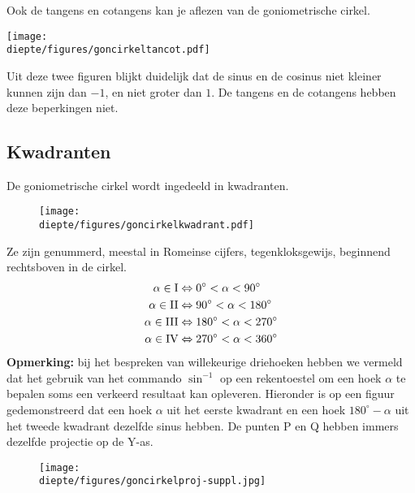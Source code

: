 \documentclass[a4paper,12pt]{article}
\newcommand{\diepte}{./}
\begin{document}
Ook de tangens en cotangens kan je aflezen van de goniometrische cirkel.

\begin{center}
\texttt{[image: \\diepte/figures/goncirkeltancot.pdf]}
\end{center}

Uit deze twee figuren blijkt duidelijk dat de sinus en de cosinus niet kleiner kunnen zijn dan $-1$, en niet groter dan $1$. De tangens en de cotangens hebben deze beperkingen niet.

\subsection{Kwadranten}

De goniometrische cirkel wordt ingedeeld in kwadranten.

\begin{figure}[h]
\begin{center}
\texttt{[image: \\diepte/figures/goncirkelkwadrant.pdf]}
\end{center}
\end{figure}

Ze zijn genummerd, meestal in Romeinse cijfers, tegenkloksgewijs, beginnend rechtsboven in de cirkel.
\begin{align*}
\alpha \in \textup{I} &\Leftrightarrow 0^\circ < \alpha < 90^\circ\\
\alpha \in \textup{II} &\Leftrightarrow 90^\circ < \alpha < 180^\circ\\
\alpha \in \textup{III} &\Leftrightarrow 180^\circ < \alpha < 270^\circ\\
\alpha \in \textup{IV} &\Leftrightarrow 270^\circ < \alpha < 360^\circ
\end{align*}
{\bf Opmerking:} bij het bespreken van willekeurige driehoeken hebben we vermeld dat het gebruik van het commando $\sin^{-1}$ op een rekentoestel om een hoek $\alpha$ te bepalen soms een verkeerd resultaat kan opleveren. Hieronder is op een figuur gedemonstreerd dat een hoek $\alpha$ uit het eerste kwadrant en een hoek $180^\circ -\alpha$ uit het tweede kwadrant dezelfde sinus hebben. De punten P en Q hebben immers dezelfde projectie op de Y-as.
\begin{figure}[h]
\begin{center}
\texttt{[image: \\diepte/figures/goncirkelproj-suppl.jpg]}
\end{center}
\end{figure}

\newpage
\end{document}
